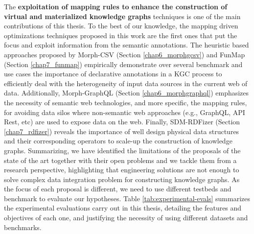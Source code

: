 The \textbf{exploitation of mapping rules to enhance the construction of virtual and materialized knowledge graphs} techniques is one of the main contributions of this thesis. To the best of our knowledge, the mapping driven optimizations techniques proposed in this work are the first ones that put the focus and exploit information from the semantic annotations. The heuristic based approaches proposed by Morph-CSV (Section \ref{chap6_morphgcsv}) and FunMap (Section \ref{chap7_funmap}) empirically demonstrate over several benchmark and use cases the importance of declarative annotations in a KGC process to efficiently deal with the heterogeneity of input data sources in the current web of data. Additionally, Morph-GraphQL (Section \ref{chap6_morphgraphql}) emphasizes the necessity of semantic web technologies, and more specific, the mapping rules, for avoiding data silos where non-semantic web approaches (e.g., GraphQL, API Rest, etc) are used to expose data on the web. Finally, SDM-RDFizer (Section \ref{chap7_rdfizer}) reveals the importance of well design physical data structures and their corresponding operators to scale-up the construction of knowledge graphs. Summarizing, we have identified the limitations of the proposals of the state of the art together with their open problems and we tackle them from a research perspective, highlighting that engineering solutions are not enough to solve complex data integration problem for constructing knowledge graphs. As the focus of each proposal is different, we need to use different testbeds and benchmark to evaluate our hypotheses. Table \ref{tab:experimental-evals} summarizes the experimental evaluations carry out in this thesis, detailing the features and objectives of each one, and justifying the necessity of using different datasets and benchmarks.

